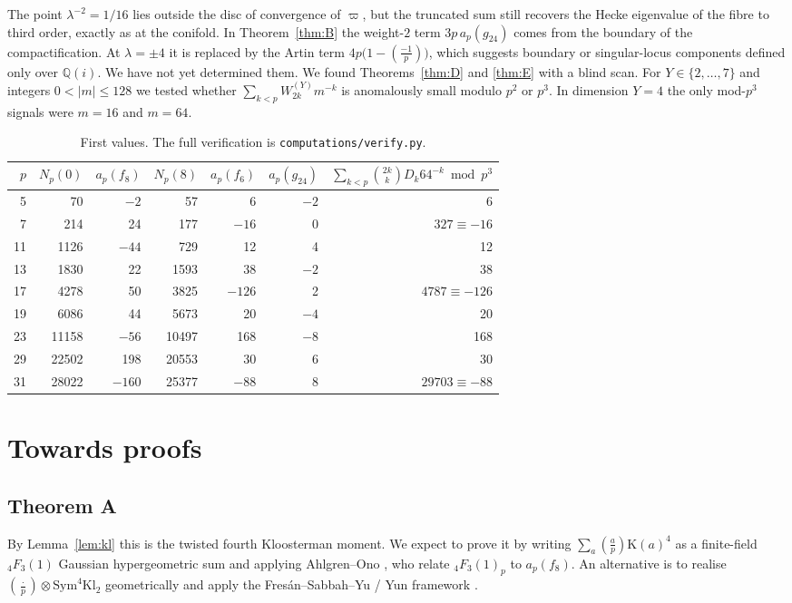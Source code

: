 \documentclass[11pt]{amsart}
\theoremstyle{definition}
\newcommand{\Q}{\mathbb{Q}}
\newcommand{\Kl}{\mathrm{K}}
\newcommand{\leg}[2]{\left(\frac{#1}{#2}\right)}
\begin{document}
The point $\lambda^{-2}=1/16$ lies outside the disc of convergence of $\varpi$, but the truncated sum still recovers the Hecke eigenvalue of the fibre to third order, exactly as at the conifold. In Theorem~\ref{thm:B} the weight-$2$ term $3p\,a_p(g_{24})$ comes from the boundary of the compactification. At $\lambda=\pm4$ it is replaced by the Artin term $4p\big(1-\leg{-1}p\big)$, which suggests boundary or singular-locus components defined only over $\Q(i)$. We have not yet determined them. We found Theorems~\ref{thm:D} and \ref{thm:E} with a blind scan. For $Y\in\{2,\dots,7\}$ and integers $0<|m|\le128$ we tested whether $\sum_{k<p}W^{(Y)}_{2k}m^{-k}$ is anomalously small modulo $p^2$ or $p^3$. In dimension $Y=4$ the only mod-$p^3$ signals were $m=16$ and $m=64$.

\begin{table}[h]
\centering
\begin{tabular}{rrrrrrr}
\toprule
$p$ & $N_p(0)$ & $a_p(f_8)$ & $N_p(8)$ & $a_p(f_6)$ & $a_p(g_{24})$ & $\sum_{k<p}\binom{2k}kD_k64^{-k}\bmod p^3$\\
\midrule
5 & 70 & $-2$ & 57 & 6 & $-2$ & 6\\
7 & 214 & 24 & 177 & $-16$ & 0 & $327\equiv-16$\\
11 & 1126 & $-44$ & 729 & 12 & 4 & 12\\
13 & 1830 & 22 & 1593 & 38 & $-2$ & 38\\
17 & 4278 & 50 & 3825 & $-126$ & 2 & $4787\equiv-126$\\
19 & 6086 & 44 & 5673 & 20 & $-4$ & 20\\
23 & 11158 & $-56$ & 10497 & 168 & $-8$ & 168\\
29 & 22502 & 198 & 20553 & 30 & 6 & 30\\
31 & 28022 & $-160$ & 25377 & $-88$ & 8 & $29703\equiv-88$\\
\bottomrule
\end{tabular}
\caption{First values. The full verification is \texttt{computations/verify.py}.}
\end{table}

\section{Towards proofs}\label{sec:proofs}

\subsection*{Theorem A}
By Lemma~\ref{lem:kl} this is the twisted fourth Kloosterman moment. We expect to prove it by writing $\sum_a\leg ap\Kl(a)^4$ as a finite-field ${}_4F_3(1)$ Gaussian hypergeometric sum and applying Ahlgren--Ono \cite{AO}, who relate ${}_4F_3(1)_p$ to $a_p(f_8)$. An alternative is to realise $\leg{\cdot}{p}\otimes\mathrm{Sym}^4\mathrm{Kl}_2$ geometrically and apply the Fresán--Sabbah--Yu / Yun framework \cite{FSY,Yun}.
\end{document}
